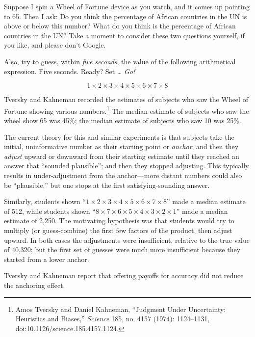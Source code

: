 
{
 Suppose I spin a Wheel of Fortune device as you watch, and it
comes up pointing to 65. Then I ask: Do you think the percentage of
African countries in the UN is above or below this number? What do you
think is the percentage of African countries in the UN? Take a moment
to consider these two questions yourself, if you like, and please
don't Google. }

{
 Also, try to guess, within \textit{five seconds}, the value of the
following arithmetical expression. Five seconds. Ready? Set \ldots
\textit{Go!}}

\begin{equation*}
 1 \times 2 \times 3 \times 4 \times 5
\times 6 \times 7 \times 8
\end{equation*}


{
 Tversky and Kahneman recorded the estimates of subjects who saw
the Wheel of Fortune showing various numbers.\footnote{Amos Tversky and Daniel Kahneman, ``Judgment
Under Uncertainty: Heuristics and Biases,''
\textit{Science} 185, no. 4157 (1974): 1124--1131,
doi:10.1126/science.185.4157.1124.} The
median estimate of subjects who saw the wheel show 65 was 45\%; the
median estimate of subjects who saw 10 was 25\%. }

{
 The current theory for this and similar experiments is that
subjects take the initial, uninformative number as their starting point
or \textit{anchor}; and then they \textit{adjust} upward or downward
from their starting estimate until they reached an answer that
``sounded plausible''; and then they
stopped adjusting. This typically results in under-adjustment from the
anchor---more distant numbers could also be
``plausible,'' but one stops at the
first satisfying-sounding answer.}

{
 Similarly, students shown ``$1 \times 2
\times 3 \times 4 \times 5 \times 6
\times 7 \times 8$'' made a median
estimate of 512, while students shown ``$8 \times
7 \times 6 \times 5 \times 4 \times 3
\times 2 \times 1$'' made a median
estimate of 2,250. The motivating hypothesis was that students would
try to multiply (or guess-combine) the first few factors of the
product, then adjust upward. In both cases the adjustments were
insufficient, relative to the true value of 40,320; but the first set
of guesses were much more insufficient because they started from a
lower anchor.}

{
 Tversky and Kahneman report that offering payoffs for accuracy did
not reduce the anchoring effect.}

